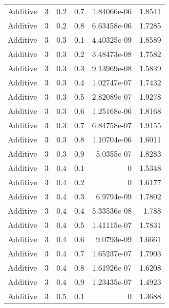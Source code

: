 \documentclass{article}
\begin{document}
\begin{longtable}[H]{lrrrrr}
 Additive       &       3 &   0.2 &            0.7 &   1.84066e-06 &          1.8541 \\
 Additive       &       3 &   0.2 &            0.8 &   6.63458e-06 &          1.7285 \\
 Additive       &       3 &   0.3 &            0.1 &   4.40325e-09 &          1.8589 \\
 Additive       &       3 &   0.3 &            0.2 &   3.48473e-08 &          1.7582 \\
 Additive       &       3 &   0.3 &            0.3 &   9.13969e-08 &          1.5839 \\
 Additive       &       3 &   0.3 &            0.4 &   1.02747e-07 &          1.7432 \\
 Additive       &       3 &   0.3 &            0.5 &   2.82089e-07 &          1.9278 \\
 Additive       &       3 &   0.3 &            0.6 &   1.25168e-06 &          1.8168 \\
 Additive       &       3 &   0.3 &            0.7 &   6.84758e-07 &          1.9155 \\
 Additive       &       3 &   0.3 &            0.8 &   1.10704e-06 &          1.6011 \\
 Additive       &       3 &   0.3 &            0.9 &   5.0355e-07  &          1.8283 \\
 Additive       &       3 &   0.4 &            0.1 &   0           &          1.5348 \\
 Additive       &       3 &   0.4 &            0.2 &   0           &          1.6177 \\
 Additive       &       3 &   0.4 &            0.3 &   6.9794e-09  &          1.7802 \\
 Additive       &       3 &   0.4 &            0.4 &   5.33536e-08 &          1.788  \\
 Additive       &       3 &   0.4 &            0.5 &   1.41115e-07 &          1.7831 \\
 Additive       &       3 &   0.4 &            0.6 &   9.0793e-09  &          1.6661 \\
 Additive       &       3 &   0.4 &            0.7 &   1.65237e-07 &          1.7903 \\
 Additive       &       3 &   0.4 &            0.8 &   1.61926e-07 &          1.6208 \\
 Additive       &       3 &   0.4 &            0.9 &   1.23435e-07 &          1.4923 \\
 Additive       &       3 &   0.5 &            0.1 &   0           &          1.3688 \\

\end{longtable}
\end{document}
